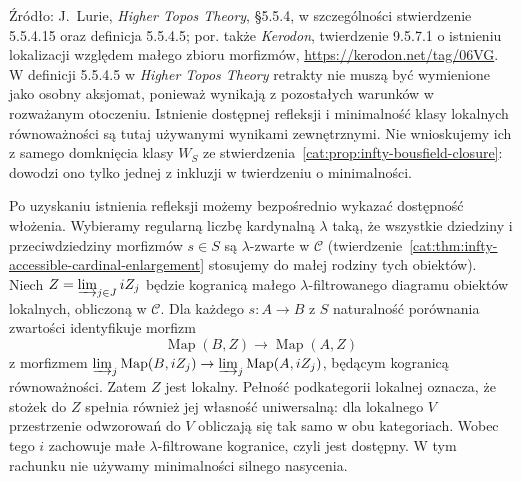 Źródło: J.~Lurie, \emph{Higher Topos Theory}, \S5.5.4, w szczególności stwierdzenie 5.5.4.15 oraz definicja 5.5.4.5; por. także \emph{Kerodon}, twierdzenie 9.5.7.1 o istnieniu lokalizacji względem małego zbioru morfizmów, \url{https://kerodon.net/tag/06VG}. W definicji 5.5.4.5 w \emph{Higher Topos Theory} retrakty nie muszą być wymienione jako osobny aksjomat, ponieważ wynikają z pozostałych warunków w rozważanym otoczeniu. Istnienie dostępnej refleksji i minimalność klasy lokalnych równoważności są tutaj używanymi wynikami zewnętrznymi. Nie wnioskujemy ich z samego domknięcia klasy $W_S$ ze stwierdzenia~\ref{cat:prop:infty-bousfield-closure}: dowodzi ono tylko jednej z inkluzji w twierdzeniu o minimalności.

Po uzyskaniu istnienia refleksji możemy bezpośrednio wykazać dostępność włożenia. Wybieramy regularną liczbę kardynalną $\lambda$ taką, że wszystkie dziedziny i przeciwdziedziny morfizmów $s\in S$ są $\lambda$-zwarte w $\mathcal C$ (twierdzenie~\ref{cat:thm:infty-accessible-cardinal-enlargement} stosujemy do małej rodziny tych obiektów). Niech $Z=\varinjlim_{j\in J}iZ_j$ będzie kogranicą małego $\lambda$-filtrowanego diagramu obiektów lokalnych, obliczoną w $\mathcal C$. Dla każdego $s:A\to B$ z $S$ naturalność porównania zwartości identyfikuje morfizm
\[
 \operatorname{Map}(B,Z)\longrightarrow\operatorname{Map}(A,Z)
\]
z morfizmem $\varinjlim_j\operatorname{Map}(B,iZ_j)\to\varinjlim_j\operatorname{Map}(A,iZ_j)$, będącym kogranicą równoważności. Zatem $Z$ jest lokalny. Pełność podkategorii lokalnej oznacza, że stożek do $Z$ spełnia również jej własność uniwersalną: dla lokalnego $V$ przestrzenie odwzorowań do $V$ obliczają się tak samo w obu kategoriach. Wobec tego $i$ zachowuje małe $\lambda$-filtrowane kogranice, czyli jest dostępny. W tym rachunku nie używamy minimalności silnego nasycenia.

